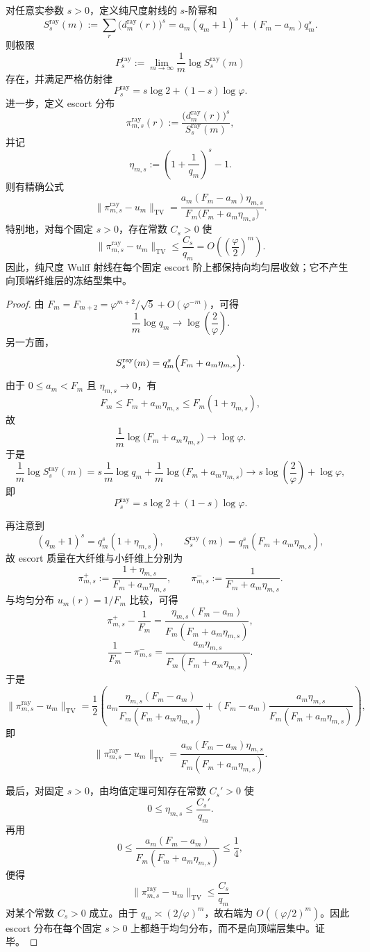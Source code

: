 \begin{theorem}\label{thm:conclusion-serrin-wulff-ray-affine-pressure-escort-uniformization}
对任意实参数 \(s>0\)，定义纯尺度射线的 \(s\)-阶幂和
\[
S_s^{\mathrm{ray}}(m)
:=
\sum_r \bigl(d_m^{\mathrm{ray}}(r)\bigr)^s
=
a_m(q_m+1)^s+(F_m-a_m)q_m^s.
\]
则极限
\[
P_s^{\mathrm{ray}}
:=
\lim_{m\to\infty}\frac1m\log S_s^{\mathrm{ray}}(m)
\]
存在，并满足严格仿射律
\[
P_s^{\mathrm{ray}}=s\log 2+(1-s)\log\varphi.
\]
进一步，定义 escort 分布
\[
\pi_{m,s}^{\mathrm{ray}}(r)
:=
\frac{\bigl(d_m^{\mathrm{ray}}(r)\bigr)^s}{S_s^{\mathrm{ray}}(m)},
\]
并记
\[
\eta_{m,s}:=\left(1+\frac1{q_m}\right)^s-1.
\]
则有精确公式
\[
\bigl\|\pi_{m,s}^{\mathrm{ray}}-u_m\bigr\|_{\mathrm{TV}}
=
\frac{a_m(F_m-a_m)\eta_{m,s}}
{F_m\bigl(F_m+a_m\eta_{m,s}\bigr)}.
\]
特别地，对每个固定 \(s>0\)，存在常数 \(C_s>0\) 使
\[
\bigl\|\pi_{m,s}^{\mathrm{ray}}-u_m\bigr\|_{\mathrm{TV}}
\le
\frac{C_s}{q_m}
=
O\!\left(\left(\frac{\varphi}{2}\right)^m\right).
\]
因此，纯尺度 Wulff 射线在每个固定 escort 阶上都保持向均匀层收敛；它不产生向顶端纤维层的冻结型集中。
\end{theorem}
\begin{proof}
由 \(F_m=F_{m+2}=\varphi^{m+2}/\sqrt5+O(\varphi^{-m})\)，可得
\[
\frac1m\log q_m\longrightarrow \log\!\left(\frac2\varphi\right).
\]
另一方面，
\[
S_s^{\mathrm{ray}}(m)
=
q_m^s\Bigl(F_m+a_m\eta_{m,s}\Bigr).
\]
由于 \(0\le a_m<F_m\) 且 \(\eta_{m,s}\to 0\)，有
\[
F_m\le F_m+a_m\eta_{m,s}\le F_m(1+\eta_{m,s}),
\]
故
\[
\frac1m\log\bigl(F_m+a_m\eta_{m,s}\bigr)
\longrightarrow
\log\varphi.
\]
于是
\[
\frac1m\log S_s^{\mathrm{ray}}(m)
=
s\,\frac1m\log q_m+\frac1m\log\bigl(F_m+a_m\eta_{m,s}\bigr)
\longrightarrow
s\log\!\left(\frac2\varphi\right)+\log\varphi,
\]
即
\[
P_s^{\mathrm{ray}}=s\log2+(1-s)\log\varphi.
\]

再注意到
\[
(q_m+1)^s=q_m^s(1+\eta_{m,s}),
\qquad
S_s^{\mathrm{ray}}(m)=q_m^s(F_m+a_m\eta_{m,s}),
\]
故 escort 质量在大纤维与小纤维上分别为
\[
\pi_{m,s}^+:=\frac{1+\eta_{m,s}}{F_m+a_m\eta_{m,s}},
\qquad
\pi_{m,s}^-:=\frac{1}{F_m+a_m\eta_{m,s}}.
\]
与均匀分布 \(u_m(r)=1/F_m\) 比较，可得
\[
\pi_{m,s}^+-\frac1{F_m}
=
\frac{\eta_{m,s}(F_m-a_m)}{F_m(F_m+a_m\eta_{m,s})},
\]
\[
\frac1{F_m}-\pi_{m,s}^-
=
\frac{a_m\eta_{m,s}}{F_m(F_m+a_m\eta_{m,s})}.
\]
于是
\[
\bigl\|\pi_{m,s}^{\mathrm{ray}}-u_m\bigr\|_{\mathrm{TV}}
=
\frac12\left(
a_m\frac{\eta_{m,s}(F_m-a_m)}{F_m(F_m+a_m\eta_{m,s})}
+(F_m-a_m)\frac{a_m\eta_{m,s}}{F_m(F_m+a_m\eta_{m,s})}
\right),
\]
即
\[
\bigl\|\pi_{m,s}^{\mathrm{ray}}-u_m\bigr\|_{\mathrm{TV}}
=
\frac{a_m(F_m-a_m)\eta_{m,s}}
{F_m(F_m+a_m\eta_{m,s})}.
\]

最后，对固定 \(s>0\)，由均值定理可知存在常数 \(C_s'>0\) 使
\[
0\le \eta_{m,s}\le \frac{C_s'}{q_m}.
\]
再用
\[
0\le \frac{a_m(F_m-a_m)}{F_m(F_m+a_m\eta_{m,s})}\le \frac14,
\]
便得
\[
\bigl\|\pi_{m,s}^{\mathrm{ray}}-u_m\bigr\|_{\mathrm{TV}}
\le
\frac{C_s}{q_m}
\]
对某个常数 \(C_s>0\) 成立。由于 \(q_m\asymp (2/\varphi)^m\)，故右端为 \(O((\varphi/2)^m)\)。因此 escort 分布在每个固定 \(s>0\) 上都趋于均匀分布，而不是向顶端层集中。证毕。
\end{proof}

